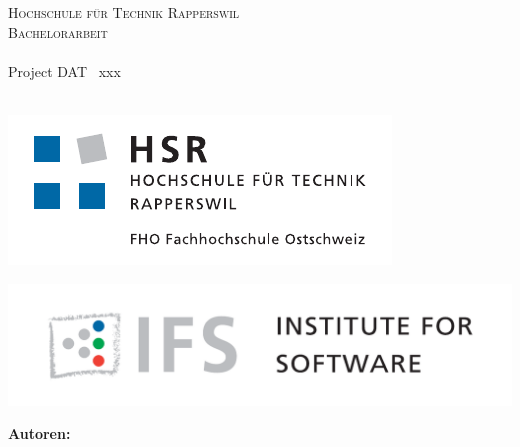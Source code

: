
\author{
	\rlif \\
	\and
	\chuf \\
	\and
	\fscf \\
}

\clearpage
\begin{titlepage}
	
	\begin{center}
		\textsc{Hochschule für Technik Rapperswil} \\
		\textsc{Bachelorarbeit} \\ [25pt]
		\hr{0.5pt} \\[0.4cm]
		\huge Project DAT \textendash\ xxx \\
		\hr{2pt} \\[0.5cm]
		
		
		\begin{figure}[H]
			\centering
		\end{figure}
		
		\begin{minipage}{0.49\textwidth}
			\includegraphics[width=\textwidth]{fig/hsr-logo}
		\end{minipage}
		\begin{minipage}{0.49\textwidth}
			\includegraphics[width=\textwidth]{fig/ifs-logo}
		\end{minipage}
		
		\vfill
	\end{center}
	
		
	\begin{flushleft}
		\textbf{\LARGE Autoren:}\\
		\Large \rlif \\
		\Large \chuf \\
		\Large \fscf \\
		\vspace{1cm}
		

\end{flushleft}
\end{titlepage}
